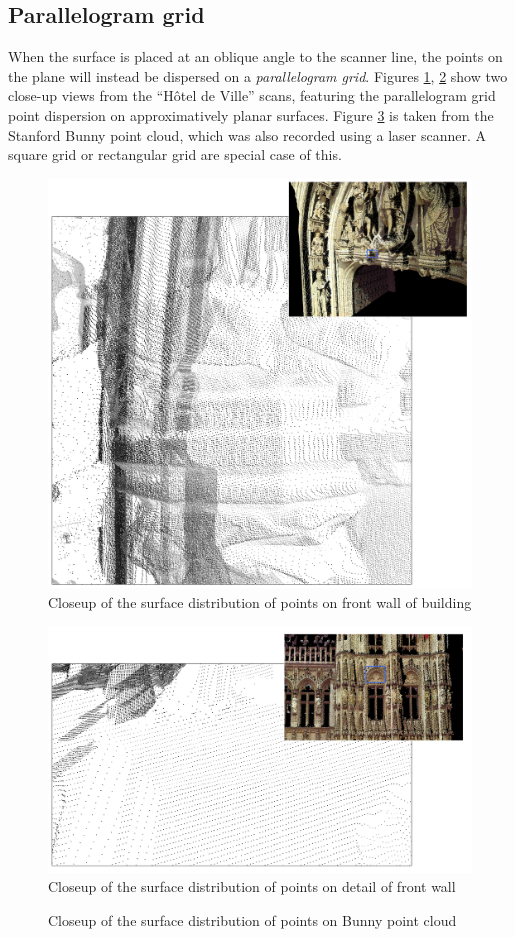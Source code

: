 \subsection{Parallelogram grid}
When the surface is placed at an oblique angle to the scanner line, the points on the plane will instead be dispersed on a \emph{parallelogram grid}. Figures \ref{fig:closeup_ddp}, \ref{fig:closeup_wall} show two close-up views from the ``Hôtel de Ville'' scans, featuring the parallelogram grid point dispersion on approximatively planar surfaces. Figure \ref{fig:bunny_grid_closeup} is taken from the Stanford Bunny point cloud, which was also recorded using a laser scanner. A square grid or rectangular grid are special case of this.

\begin{figure}[h]
\centering
\includegraphics[width=.5\textwidth]{fig/closeup_ddp.png}
\caption{Closeup of the surface distribution of points on front wall of building}
\label{fig:closeup_ddp}
\end{figure}

\begin{figure}[h]
\centering
\includegraphics[width=.5\textwidth]{fig/closeup_wall.png}
\caption{Closeup of the surface distribution of points on detail of front wall}
\label{fig:closeup_wall}
\end{figure}

\begin{figure}[h]
\centering
{
	\setlength{\fboxsep}{0pt}%
	\setlength{\fboxrule}{0.5pt}%
}
\caption{Closeup of the surface distribution of points on Bunny point cloud}
\label{fig:bunny_grid_closeup}
\end{figure}


